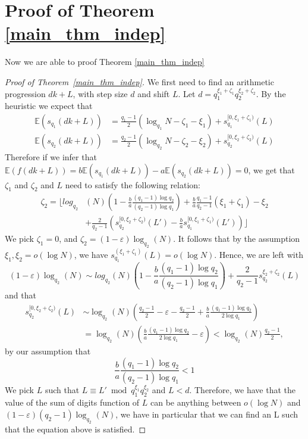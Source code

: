 \documentclass[12pt]{amsart}
\theoremstyle{definition}
\numberwithin{equation}{section}
\numberwithin{equation}{section}
\begin{document}
\section{Proof of Theorem \ref{main_thm_indep}}\label{sec_proof_main_theorem}
Now we are able to proof Theorem \ref{main_thm_indep}
\begin{proof}[Proof of Theorem~\ref{main_thm_indep}]
	We first need to find an arithmetic progression $dk+L$, with step size $d$ and shift $L$. Let $d=q_1^{\xi_1+\zeta_1}q_2^{\xi_2+\zeta_2}$. By the heuristic we expect that
	\begin{align}
		\mathbb{E}(s_{q_1}(dk+L))&=\frac{q_1-1}{2}(\log_{q_1}N - \zeta_1 - \xi_1) + s_{q_1}^{[0,\xi_1+\zeta_1)}(L)\\
		\mathbb{E}(s_{q_2}(dk+L))&=\frac{q_2-1}{2}(\log_{q_2}N - \zeta_2 - \xi_2) + s_{q_2}^{[0,\xi_2+\zeta_2)}(L)
	\end{align}
	Therefore if we infer that $\mathbb{E}(f(dk+L))=b\mathbb{E}(s_{q_1}(dk+L))-a\mathbb{E}(s_{q_2}(dk+L))=0$, we get that $\zeta_1$ and $\zeta_2$ and $L$ need to satisfy the following relation:
	\begin{align*}
	    \zeta_2 =  \Biggl\lfloor log_{q_2}&(N)\left(1-\frac ba \frac{(q_1-1)\log q_2}{(q_2-1)\log q_1}\right)+\frac ba \frac{q_1-1}{q_2-1}(\xi_1+\zeta_1)-\xi_2\\
        &+\frac{2}{q_2-1}\left(s_{q_2}^{[0,\xi_2+\zeta_2)}(L')-\frac ba s_{q_1}^{[0,\xi_1+\zeta_1)}(L')\right)\Biggr\rfloor
	\end{align*}
	We pick $\zeta_1 = 0$, and $\zeta_2 = (1-\varepsilon)\log_{q_2}(N)$. It follows that by the assumption $\xi_1,\xi_2=o(\log N)$, we have $s_{q_1}^{(\xi_1+\zeta_1)}(L)=o(\log N)$. Hence, we are left with
	\[
	(1-\varepsilon)\log_{q_2}(N) \sim log_{q_2}(N)\left(1-\frac ba \frac{(q_1-1)\log q_2}{(q_2-1)\log q_1}\right) + \frac{2}{q_2-1}s_{q_2}^{\xi_2+\zeta_2}(L)
	\]
	and that
	\begin{align*}
	s_{q_2}^{[0,\xi_2+\zeta_2)}(L) &\sim \log_{q_2}(N)\left(\frac{q_2-1}{2}-\varepsilon-\frac{q_2-1}{2}+\frac ba \frac{(q_1-1)\log q_2}{2\log q_1}\right)\\
	&= \log_{q_2}(N)\left(\frac ba \frac{(q_1-1)\log q_2}{2\log q_1}-\varepsilon\right) < \log_{q_2} (N) \frac{q_2-1}{2},
	\end{align*}
	by our assumption that
	\[
		\frac ba \frac{(q_1-1)\log q_2}{(q_2-1)\log q_1}<1
	\]
	We pick $L$ such that $L\equiv L' \bmod q_1^{\xi_1}q_2^{\xi_2}$ and $L < d$. Therefore, we have that the value of the sum of digits function of $L$ can be anything between $o(\log N)$ and $(1-\varepsilon)(q_2-1)\log_{q_2}(N)$, we have in particular that we can find an L such that the equation above is satisfied.
	

\end{proof}
\end{document}

